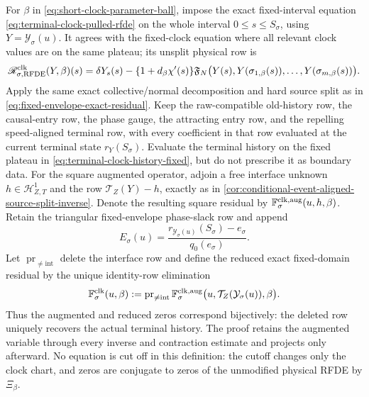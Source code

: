 \begin{theorem}
For \(\beta\) in \cref{eq:short-clock-parameter-ball}, impose the exact
fixed-interval equation \cref{eq:terminal-clock-pulled-rfde} on the whole
interval \(0\le s\le S_\sigma\), using
\(Y=\mathcal Y_\sigma(u)\).  It agrees with the fixed-clock equation where
all relevant clock values are on the same plateau; its unsplit physical
row is
\begin{equation}
 \mathscr R_{\sigma,\rm RFDE}^{\rm clk}(Y,\beta)(s)
 =\delta Y_s(s)-\{1+d_\beta\chi'(s)\}
  \mathfrak F_N\bigl(Y(s),Y(\sigma_{1,\beta}(s)),\ldots,
                         Y(\sigma_{m,\beta}(s))\bigr).
                                                        \label{eq:short-clock-unsplit-rfde-row}
\end{equation}
Apply the same exact collective/normal decomposition and hard source split
as in \cref{eq:fixed-envelope-exact-residual}.  Keep the raw-compatible old-history row, the
causal-entry row, the phase gauge, the attracting entry row, and the
repelling speed-aligned terminal row, with every coefficient in that row
evaluated at the current terminal state \(r_Y(S_\sigma)\).  Evaluate the
terminal history on the fixed plateau in
\cref{eq:terminal-clock-history-fixed}, but do not prescribe it as boundary
data.  For the square augmented operator, adjoin a free interface unknown
\(h\in\mathcal H_{Z,T}^1\) and the row
\(\mathcal T_Z(Y)-h\), exactly as in
\cref{cor:conditional-event-aligned-source-split-inverse}.  Denote the
resulting square residual by
\(\mathbb F_\sigma^{\rm clk,aug}(u,h,\beta)\).  Retain the triangular
fixed-envelope phase-slack row and
append
\begin{equation}
 E_\sigma(u)=
 \frac{r_{\mathcal Y_\sigma(u)}(S_\sigma)-e_\sigma}
      {q_0(e_\sigma)}.                           \label{eq:short-clock-nonlinear-event}
\end{equation}
Let \(\operatorname{pr}_{\ne\mathrm{int}}\) delete the interface row and
define the reduced exact fixed-domain residual by the unique identity-row
elimination
\begin{equation}
 \mathbb F_\sigma^{\rm clk}(u,\beta)
 :=\operatorname{pr}_{\ne\mathrm{int}}
 \mathbb F_\sigma^{\rm clk,aug}
  \bigl(u,\mathcal T_Z(\mathcal Y_\sigma(u)),\beta\bigr).
                                                        \label{eq:short-clock-exact-residual}
\end{equation}
Thus the augmented and reduced zeros correspond bijectively: the deleted
row uniquely recovers the actual terminal history.  The proof retains the
augmented variable through every inverse and contraction estimate and
projects only afterward.
No equation is cut off in this definition: the cutoff changes only the
clock chart, and zeros are conjugate to zeros of the unmodified physical
RFDE by \(\Xi_\beta\).


\end{theorem}
